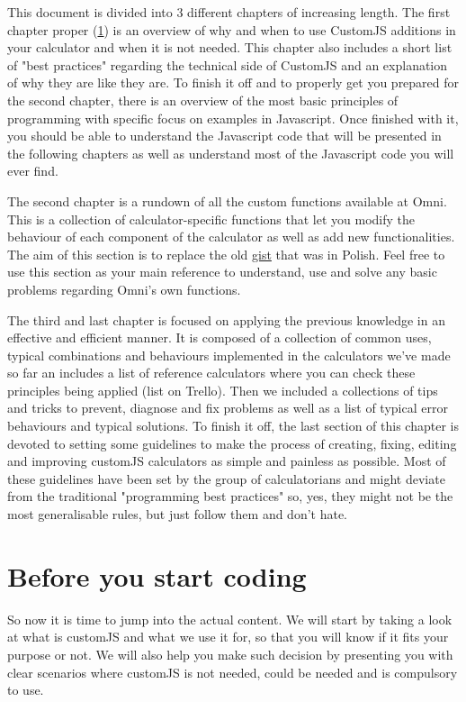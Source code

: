 \documentclass[11pt,a4paper,oldfontcommands]{memoir}
\begin{document}
This document is divided into 3 different chapters of increasing length. The first chapter proper (\ref{chap:b4}) is an overview of why and when to use CustomJS additions in your calculator and when it is not needed. This chapter also includes a short list of "best practices" regarding the technical side of CustomJS and an explanation of why they are like they are. To finish it off and to properly get you prepared for the second chapter, there is an overview of the most basic principles of programming with specific focus on examples in Javascript. Once finished with it, you should be able to understand the Javascript code that will be presented in the following chapters as well as understand most of the Javascript code you will ever find.

The second chapter is a rundown of all the custom functions available at Omni. This is a collection of calculator-specific functions that let you modify the behaviour of each component of the calculator as well as add new functionalities. The aim of this section is to replace the old \href{https://gist.github.com/trojanowski/1fd347f2b0cba5bd7ce3deb5fd3566af}{gist} that was in Polish. Feel free to use this section as your main reference to understand, use and solve any basic problems regarding Omni's own functions. 

The third and last chapter is focused on applying the previous knowledge in an effective and efficient manner. It is composed of a collection of common uses, typical combinations and behaviours implemented in the calculators we've made so far an includes a list of reference calculators where you can check these principles being applied (list on Trello). Then we included a collections of tips and tricks to prevent, diagnose and fix problems as well as a list of typical error behaviours and typical solutions. To finish it off, the last section of this chapter is devoted to setting some guidelines to make the process of creating, fixing, editing and improving customJS calculators as simple and painless as possible. Most of these guidelines have been set by the group of calculatorians and might deviate from the traditional "programming best practices" so, yes, they might not be the most generalisable rules, but just follow them and don't hate. 

\chapter{Before you start coding}
    \label{chap:b4}
So now it is time to jump into the actual content. We will start by taking a look at what is customJS and what we use it for, so that you will know if it fits your purpose or not. We will also help you make such decision by presenting you with clear scenarios where customJS is not needed, could be needed and is compulsory to use. 
\end{document}
